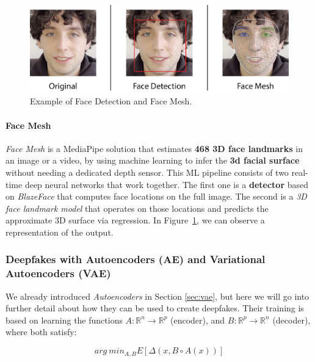 \documentclass[preprint]{elsarticle}
\begin{document}
\begin{figure}[t]
	\centering
	\includegraphics[scale=0.65, keepaspectratio]{img/background_img/MediapipeDemo.png}
	\caption{Example of Face Detection and Face Mesh.}\label{fig:MediapipeDemo}
\end{figure}


\paragraph{Face Mesh}


\emph{Face Mesh} is a MediaPipe solution that estimates \textbf{468 3D face landmarks} in an image or a video,
by using machine learning to infer the \textbf{3d facial surface} without needing a dedicated depth sensor.
This ML pipeline consists of two real-time deep neural networks that work together.
The first one is a \textbf{detector} based on \emph{BlazeFace} that computes face locations on the full image.
The second is a \emph{3D face landmark model} \cite{kartynnik2019realtime} that operates on those locations and predicts the 
approximate 3D surface via regression. In Figure~\ref{fig:MediapipeDemo}, we can observe a representation of the output.




\subsubsection{Deepfakes with Autoencoders (AE) and Variational Autoencoders (VAE)}\label{sec:deep-vae}

We already introduced \emph{Autoencoders} \cite{bank2021autoencoders} in Section \ref{sec:vae}, but here we will go into further detail  about how they can be used to create deepfakes. Their training is based on learning the functions $A : \mathbb{R}^n \rightarrow \mathbb{R}^p$ (encoder), 
and $B:\mathbb{R}^p \rightarrow \mathbb{R}^n$ (decoder), where both satisfy:

\begin{equation}
	arg~min_{A,B}E[\Delta(x,B \circ A(x))]
\end{equation}
\end{document}

